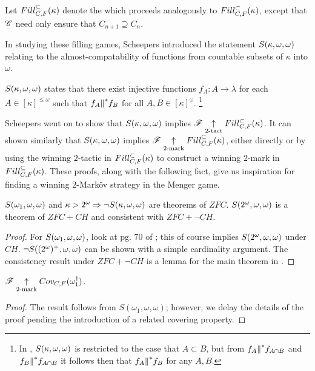 \begin{game}
  Let $Fill^{\subseteq}_{C,F}(\kappa)$ denote the
   which proceeds analogously
  to $Fill^{\subset}_{C,F}(\kappa)$, except that $\mathscr{C}$ need only ensure that
  $C_{n+1}\supseteq C_n$.
\end{game}

In studying these filling games, Scheepers introduced the statement
$S(\kappa,\omega,\omega)$ relating to the almost-compatability of functions
from countable subsets of $\kappa$ into $\omega$.

\begin{defn}
  $S(\kappa,\omega,\omega)$ states that there exist injective functions
  $f_A:A\to\lambda$ for each $A\in[\kappa]^{\leq\omega}$ such that
  $f_A{\parallel}^* f_B$ for all $A,B\in[\kappa]^\omega$.
  \footnote{
    In \cite{MR1129143}, $S(\kappa,\omega,\omega)$ is restricted to the case that
    $A\subset B$, but from $f_A{\parallel}^* f_{A\cap B}$ and
    $f_B{\parallel}^* f_{A\cap B}$ it follows then that $f_A{\parallel}^* f_B$ for any
    $A,B$.
  }
\end{defn}

Scheepers went on to show that $S(\kappa,\omega,\omega)$ implies
$\mathscr{F} \underset{2\text{-tact}}{\uparrow} Fill^{\subset}_{C,F}(\kappa)$. It can shown similarly that
$S(\kappa,\omega,\omega)$ implies $\mathscr{F} \underset{2\text{-mark}}{\uparrow} Fill^{\subseteq}_{C,F}(\kappa)$, either directly
or by using the winning $2$-tactic in $Fill^{\subset}_{C,F}(\kappa)$ to construct a
winning $2$-mark in $Fill^{\subseteq}_{C,F}(\kappa)$. These proofs, along with the following
fact, give us inspiration for
finding a winning $2$-Mark\"ov strategy in the Menger game.

\begin{thm}
  $S(\omega_1,\omega,\omega)$ and $\kappa>2^\omega\Rightarrow\neg S(\kappa,\omega,\omega)$
  are theorems of $ZFC$.
  $S(2^\omega,\omega,\omega)$ is a theorem of $ZFC+CH$ and consistent with
  $ZFC+\neg CH$.
\end{thm}

\begin{proof}
  For $S(\omega_1,\omega,\omega)$, look at pg. 70 of \cite{MR597342}; this of course
  implies $S(2^\omega,\omega,\omega)$ under $CH$.
  $\neg S((2^\omega)^+,\omega,\omega)$ can be shown with a simple cardinality argument.
  The consistency result under $ZFC+\neg CH$
  is a lemma for the main theorem in \cite{MR1129143}.
\end{proof}

\begin{thm}
  $\mathscr{F} \underset{2\text{-mark}}{\uparrow} Cov_{C,F}(\omega^\dagger_1)$.
\end{thm}

\begin{proof}
  The result follows from $S(\omega_1,\omega,\omega)$; however, we delay the
  details of the proof pending the introduction of a related covering property.
\end{proof}

